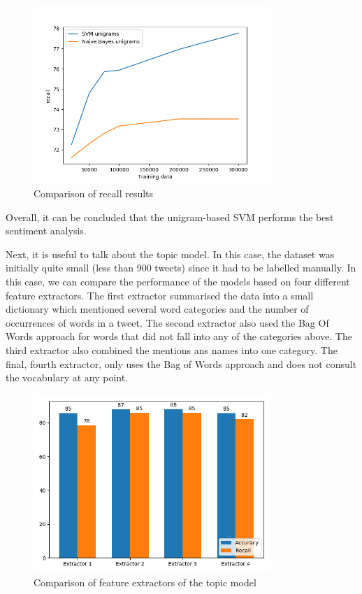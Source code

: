 \begin{figure}[ht]
    \centering
    \includegraphics[width=0.8\textwidth]{classRECComp}
    \caption{Comparison of recall results}
    \label{fig:reccomp}
\end{figure}

Overall, it can be concluded that the unigram-based SVM performs the best sentiment analysis. 

Next, it is useful to talk about the topic model. In this case, the dataset was initially quite small (less than 900 tweets) since it had to be labelled manually. In this case, we can compare the performance of the models based on four different feature extractors. 
The first extractor summarised the data into a small dictionary which mentioned several word categories and the number of occurrences of words in a tweet. The second extractor also used the Bag Of Words approach for words that did not fall into any of the categories above. The third extractor also combined the mentions ans names into one category. The final, fourth extractor, only uses the Bag of Words approach and does not consult the vocabulary at any point.

\begin{figure}[ht]
    \centering
    \includegraphics[width=0.8\textwidth]{topic}
    \caption{Comparison of feature extractors of the topic model}
    \label{fig:topicm}
\end{figure}

